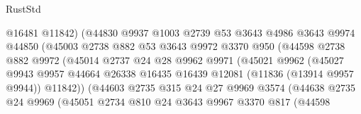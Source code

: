 \begin{lexlean}{RustStd}
\begin{coremodule}
                              @16481
                              @11842)
                            (@44830
                              @9937
                              @1003
                              @2739
                              @53
                              @3643
                              @4986
                              @3643
                              @9974
                              @44850
                              (@45003
                                @2738
                                @882
                                @53
                                @3643
                                @9972
                                @3370
                                @950
                                (@44598
                                  @2738
                                  @882
                                  @9972
                                  (@45014
                                    @2737
                                    @24
                                    @28
                                    @9962
                                    @9971
                                    (@45021
                                      @9962
                                      (@45027
                                        @9943
                                        @9957
                                        @44664
                                        @26338
                                        @16435
                                        @16439
                                        @12081
                                        (@11836 (@13914 @9957 @9944))
                                        @11842))
                                    (@44603
                                      @2735
                                      @315
                                      @24
                                      @27
                                      @9969
                                      @3574
                                      (@44638
                                        @2735
                                        @24
                                        @9969
                                        (@45051
                                          @2734
                                          @810
                                          @24
                                          @3643
                                          @9967
                                          @3370
                                          @817
                                          (@44598

\end{coremodule}
\end{lexlean}
